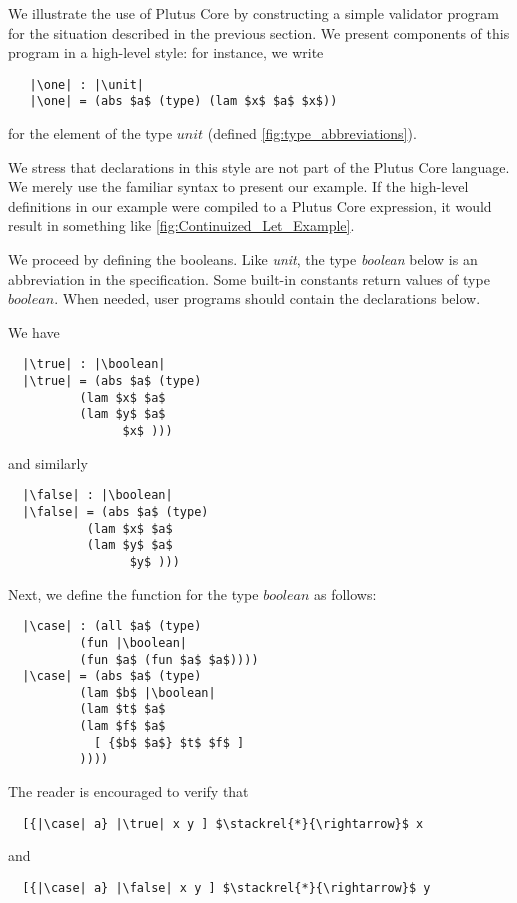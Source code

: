 \documentclass[../plutus-core-specification.tex]{subfiles}
\begin{document}
We illustrate the use of Plutus Core by constructing a simple
validator program for the situation described in the previous
section. We present components of this program in a high-level style:
for instance, we write
\begin{lstlisting}
   |\one| : |\unit|
   |\one| = (abs $a$ (type) (lam $x$ $a$ $x$))
\end{lstlisting}
for the element of the type $unit$ (defined \cref{fig:type_abbreviations}).

We stress that declarations in this style are not part of the Plutus
Core language. We merely use the familiar syntax to present our
example. If the high-level definitions in our example were compiled to
a Plutus Core expression, it would result in something like
\cref{fig:Continuized_Let_Example}.

We proceed by defining the booleans. Like \textit{unit}, the type \textit{boolean}
below is an abbreviation in the specification. Some built-in constants
return values of type $boolean$. When needed, user programs should
contain the declarations below.


\noindent We have

\begin{lstlisting}
  |\true| : |\boolean|
  |\true| = (abs $a$ (type)
          (lam $x$ $a$
          (lam $y$ $a$
                $x$ )))
\end{lstlisting}
and similarly
\begin{lstlisting}
  |\false| : |\boolean|
  |\false| = (abs $a$ (type)
           (lam $x$ $a$
           (lam $y$ $a$
                 $y$ )))
\end{lstlisting}

\noindent Next, we define the \case{} function for the type $boolean$ as follows:
\begin{lstlisting}
  |\case| : (all $a$ (type)
          (fun |\boolean|
          (fun $a$ (fun $a$ $a$))))
  |\case| = (abs $a$ (type)
          (lam $b$ |\boolean|
          (lam $t$ $a$
          (lam $f$ $a$
            [ {$b$ $a$} $t$ $f$ ]
          ))))
\end{lstlisting}
The reader is encouraged to verify that
\begin{lstlisting}
  [{|\case| a} |\true| x y ] $\stackrel{*}{\rightarrow}$ x
\end{lstlisting}
and
\begin{lstlisting}
  [{|\case| a} |\false| x y ] $\stackrel{*}{\rightarrow}$ y
\end{lstlisting}
\end{document}
